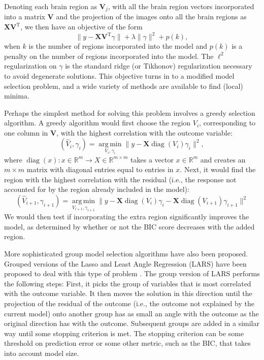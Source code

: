 \documentclass[11pt]{nih}
\begin{document}
Denoting each brain region as $\mathbf{V}_j$, with all the brain region vectors incorporated into a matrix $\mathbf{V}$ and the projection of the images onto all the brain regions as $\mathbf{XV}^{\mathrm{T}}$, we then have an objective of the form 
\begin{equation}
\| y - \mathbf{XV}^{\mathrm{T}}  \gamma \| + \lambda \| \gamma \|^2 + p(k),
\end{equation}
when $k$ is the number of regions incorporated into the model and $p(k)$ is a penalty on the number of regions incorporated into the model.   The $\ell^2$ regularization on $\gamma$ is the standard ridge (or Tikhonov) regularization necessary to avoid degenerate solutions. This objective turns in to a modified model selection problem, and a wide variety of methods are available to find (local) minima.  

Perhaps the simplest method for solving this problem involves a  greedy selection algorithm.  A greedy algorithm would first choose the region $V_i$, corresponding to one column in $\mathbf{V}$, with the highest correlation with the outcome variable:
\begin{equation}
\left(\hat{V}_i, \gamma_i \right) = \underset{V_i, \gamma_i}{\operatorname{arg \, min}} \| y - \mathbf{X} {\operatorname{diag}} (V_i) \gamma_i \|^2, 
\end{equation}
 where ${\operatorname{diag}}(x)  : x \in \mathbb{R}^m \rightarrow X \in \mathbb{R}^{m \times m}$ takes a vector $x \in \mathbb{R}^m$ and creates an $m \times m$ matrix with diagonal entries equal to entries in $x$.   Next, it would find the region with the highest correlation with the residual (i.e., the response not accounted for by the region already included in the model): 
\begin{equation}
\left(\hat{V}_{i+1}, \gamma_{i+1} \right) = \underset{V_{i+1}, \gamma_{i+1}}{\operatorname{arg \, min}} \| y - \mathbf{X} {\operatorname{diag}} (V_i) \gamma_i  - \mathbf{X} {\operatorname{diag}} (V_{i+1}) \gamma_{i+1} \|^2
\end{equation} 
We would then test if incorporating the extra region significantly improves the model, as determined by whether or not the BIC score  \cite{schwarz_estimating_1978} decreases with the added region.  



More sophisticated group model selection algorithms have also been proposed.  Grouped versions of the Lasso and Least Angle Regression (LARS) \cite{efron_least_2004} have been proposed to deal with this type of problem \cite{yuan_model_2006}.  The group version of LARS performs the following steps:  First, it picks the group of variables that is most correlated with the outcome variable.  It then moves the solution in this direction until the projection of the residual of the outcome (i.e., the outcome not explained by the current model) onto another group has as small an angle with the outcome as the original direction has with the outcome.  Subsequent groups are added in a similar way until some stopping criterion is met.  The stopping criterion can be some threshold on prediction error or some other metric, such as the BIC, that takes into account model size.
\end{document}
